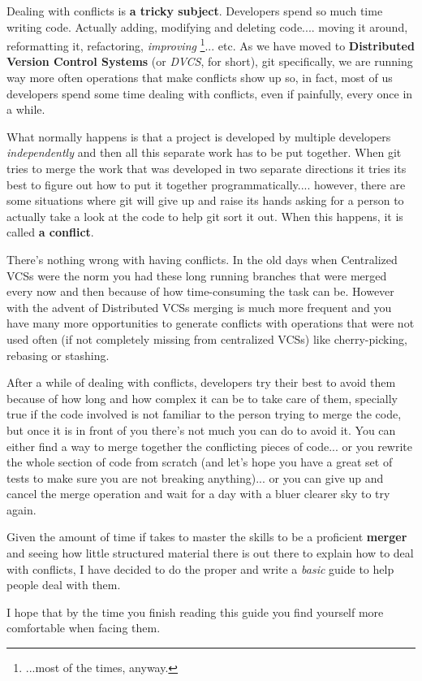 Dealing with conflicts is {\bf a tricky subject}. Developers spend so much time writing code. Actually adding,
modifying and deleting code.... moving it around, reformatting it, refactoring, {\it improving}
\footnote{...most of the times, anyway.}... etc. As we have moved to {\bf Distributed Version Control Systems} (or {\it DVCS},
for short), git specifically, we are running way more often operations that make conflicts show up so, in fact, most of us
developers spend some time dealing with conflicts, even if painfully, every once in a while.

What normally happens is that a project is developed by multiple developers {\it independently} and then all this separate work
has to be put together. When git tries to merge the work that was developed in two separate directions it tries its best to figure
out how to put it together programmatically.... however, there are some situations where git will give up and raise its hands asking
for a person to actually take a look at the code to help git sort it out. When this happens, it is called {\bf a conflict}.

There's nothing wrong with having conflicts. In the old days when Centralized VCSs were the norm you had these long running branches
that were merged every now and then because of how time-consuming the task can be. However with the advent of Distributed VCSs
merging is much more frequent and you have many more opportunities to generate conflicts with operations that were not used often
(if not completely missing from centralized VCSs) like cherry-picking, rebasing or stashing.

After a while of dealing with conflicts, developers try their best to avoid them because of how long and how complex it can be to
take care of them, specially true if the code involved is not familiar to the person trying to merge the code, but once it is in
front of you there's not much you can do to avoid it. You can either find a way to merge together the conflicting pieces of code...
or you rewrite the whole section of code from scratch (and let's hope you have a great set of tests to make sure you are not breaking
anything)... or you can give up and cancel the merge operation and wait for a day with a bluer clearer sky to try again.

Given the amount of time if takes to master the skills to be a proficient {\bf merger} and seeing how little structured material there
is out there to explain how to deal with conflicts, I have decided to do the proper and write a {\it basic} guide to help people deal
with them.

I hope that by the time you finish reading this guide you find yourself more comfortable when facing them.

